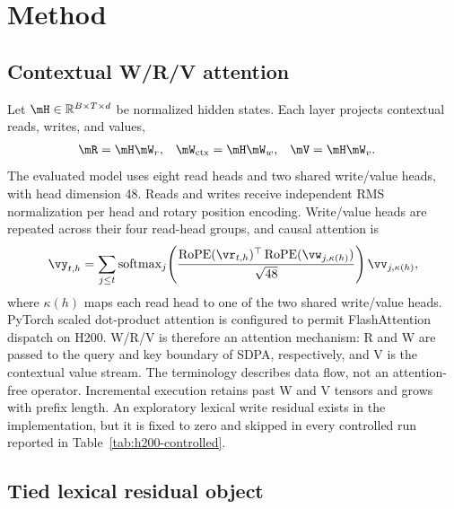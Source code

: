 \section{Method}
\label{sec:method}

\subsection{Contextual W/R/V attention}

Let $\mH\in\mathbb{R}^{B\times T\times d}$ be normalized hidden states. Each layer projects contextual reads, writes, and values,
\begin{align}
    \mR &= \mH\mW_r, &
    \mW_{\mathrm{ctx}} &= \mH\mW_w, &
    \mV &= \mH\mW_v.
\end{align}
The evaluated model uses eight read heads and two shared write/value heads, with head dimension 48. Reads and writes receive independent RMS normalization per head and rotary position encoding. Write/value heads are repeated across their four read-head groups, and causal attention is
\begin{equation}
    \vy_{t,h}=\sum_{j\le t}
    \operatorname{softmax}_j\!\left(
      \frac{\operatorname{RoPE}(\vr_{t,h})^\top
      \operatorname{RoPE}(\vw_{j,\kappa(h)})}{\sqrt{48}}
    \right)\vv_{j,\kappa(h)},
\end{equation}
where $\kappa(h)$ maps each read head to one of the two shared write/value heads. PyTorch scaled dot-product attention is configured to permit FlashAttention dispatch on H200. W/R/V is therefore an attention mechanism: R and W are passed to the query and key boundary of SDPA, respectively, and V is the contextual value stream. The terminology describes data flow, not an attention-free operator. Incremental execution retains past W and V tensors and grows with prefix length. An exploratory lexical write residual exists in the implementation, but it is fixed to zero and skipped in every controlled run reported in Table~\ref{tab:h200-controlled}.

\subsection{Tied lexical residual object}

